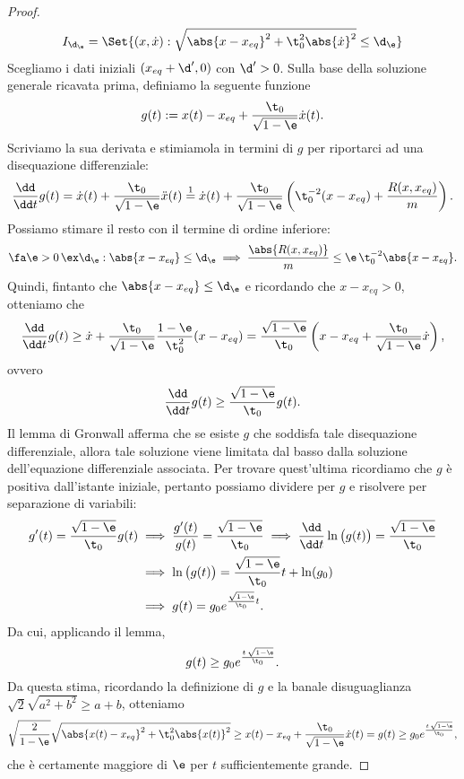 \begin{proof}
	\[
		I_{\d_\e} = \Set{(x,\dot{x}): \sqrt{\abs{x-x_{eq}}^2+\t_0^2 \abs{\dot{x}}^2} \le \d_\e}
	\]
	Scegliamo i dati iniziali \((x_{eq}+\d',0)\) con \(\d'>0\). Sulla base della soluzione generale ricavata prima, definiamo la seguente funzione
	\[
		g(t) := x(t)-x_{eq} + \frac{\t_0}{\sqrt{1-\e}}\dot{x}(t).
	\]
	Scriviamo la sua derivata e stimiamola in termini di \(g\) per riportarci ad una disequazione differenziale:
	\[
		\frac{\dd}{\dd t}g(t) = \dot{x}(t) + \frac{\t_0}{\sqrt{1-\e}}\ddot{x}(t) \overset{1}{=} \dot{x}(t) + \frac{\t_0}{\sqrt{1-\e}} \left( \t_0^{-2}(x-x_{eq}) + \frac{R(x,x_{eq})}{m} \right).
	\]
	Possiamo stimare il resto con il termine di ordine inferiore:
	\[
		\fa \e >0\,\ex \d_\e: \abs{x-x_{eq}} \le \d_\e \implies \frac{\abs{R(x,x_{eq})}}{m} \le \e\,\t_0^{-2}\abs{x-x_{eq}}.
	\]
	Quindi, fintanto che \(\abs{x-x_{eq}} \le \d_\e\) e ricordando che \(x-x_{eq} > 0\), otteniamo che
	\[
		\frac{\dd}{\dd t}g(t) \ge \dot{x} + \frac{\t_0}{\sqrt{1-\e}}\frac{1-\e}{\t_0^2}(x-x_{eq}) = \frac{\sqrt{1-\e}}{\t_0} \left( x-x_{eq}+ \frac{\t_0}{\sqrt{1-\e}}\dot{x} \right),
	\]
	ovvero
	\[
		\frac{\dd}{\dd t}g(t) \ge \frac{\sqrt{1-\e}}{\t_0}g(t).
	\]
	Il lemma di Gronwall afferma che se esiste \(g\) che soddisfa tale disequazione differenziale, allora tale soluzione viene limitata dal basso dalla soluzione dell'equazione differenziale associata.
	Per trovare quest'ultima ricordiamo che \(g\) è positiva dall'istante iniziale, pertanto possiamo dividere per \(g\) e risolvere per separazione di variabili:
	\[
		\begin{split}
			g'(t) = \frac{\sqrt{1-\e}}{\t_0}g(t) & \implies \frac{g'(t)}{g(t)} = \frac{\sqrt{1-\e}}{\t_0} \implies \frac{\dd}{\dd t}\ln\big(g(t)\big) = \frac{\sqrt{1-\e}}{\t_0}\\
			& \implies \ln\big(g(t)\big) = \frac{\sqrt{1-\e}}{\t_0}t + \ln(g_0)\\
			& \implies g(t) = g_0 e^{\frac{\sqrt{1-\e}}{\t_0}t}.
		\end{split}
	\]
	Da cui, applicando il lemma,
	\[
		g(t) \ge g_0 e^{\frac{t\,\sqrt{1-\e}}{\t_0}}.
	\]
	Da questa stima, ricordando la definizione di \(g\) e la banale disuguaglianza \(\sqrt{2}\sqrt{a^2+b^2} \ge a+b\), otteniamo
	\[
		\sqrt{\frac{2}{1-\e}}\sqrt{\abs{x(t)-x_{eq}}^2+\t_0^2\abs{x(t)}^2} \ge x(t)-x_{eq} + \frac{\t_0}{\sqrt{1-\e}}\dot{x}(t) = g(t) \ge g_0 e^{\frac{t\,\sqrt{1-\e}}{\t_0}},
	\]
	che è certamente maggiore di \(\e\) per \(t\) sufficientemente grande.
\end{proof}
